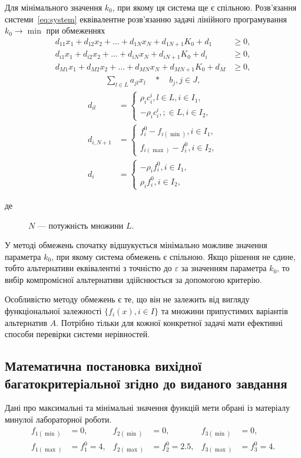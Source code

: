 Для мінімального значення $k_0$, при якому ця система ще є спільною. 
Розв'язання системи~\eqref{eq:system} еквівалентне розв'язанню задачі лінійного програмування $k_0 \to \min$ при обмеженнях 
\begin{align*}
	d_{11} x_1 	+ d_{12} x_2 + \ldots + d_{1N} x_N + d_{1 N+1} K_0 + d_1 &\geq 0, \\
	d_{i1} x_1 	+ d_{i2} x_2 + \ldots + d_{iN} x_N + d_{i N+1} K_0 + d_i &\geq 0, \\
	d_{M1} x_1 	+ d_{M2} x_2 + \ldots + d_{MN} x_N + d_{M N+1} K_0 + d_M &\geq 0,
\end{align*}
\begin{gather*}
	\sum_{l \in L}{a_{jl} x_l \quad * \quad b_j}, j \in J,
\end{gather*}
\begin{align*}
	d_{il} &= 
	\begin{cases}
		\rho_i c_{i}^i, l \in L, i \in I_1, \\
		-\rho_i c_{i}^i, ; \in L, i \in I_2, 
	\end{cases} \\
	d_{i, N+1} &= 
	\begin{cases}
		f_{i}^0 - f_{i(\min)}, i \in I_1, \\
		f_{i(\max)} - f_{i}^0 , i \in I_2,
	\end{cases} \\
	d_{i} &= 
	\begin{cases}
		- \rho_i f_{i}^0, i \in I_1, \\
		\rho_i f_{i}^0, i \in I_2, 
	\end{cases}
\end{align*}
\begin{description}
\item[де] $N$ --- потужність множини $L$.
\end{description}

У методі обмежень спочатку відшукується мінімально можливе значення параметра $k_0$, при якому система обмежень є спільною. 
Якщо рішення не єдине, тобто альтернативи еквівалентні з точністю до $\varepsilon$ за значенням параметра $k_0$, то вибір компромісної альтернативи здійснюється за допомогою критерію.

Особливістю методу обмежень є те, що він не залежить від вигляду функціональної залежності $\{ f_i(x), i \in I \}$ та множини припустимих варіантів альтернатив $A$.
Потрібно тільки для кожної конкретної задачі мати ефективні способи перевірки системи нерівностей.

\subsection{Математична постановка вихідної багатокритеріальної згідно до виданого завдання}
Дані про максимальні та мінімальні значення функцій мети обрані із матеріалу минулої лабораторної роботи.
\begin{align*}
    f_{1(\min)}&=0, &   f_{2(\min)}&=0, &   f_{3(\min)}&=0, \\
    f_{1(\max)}&=f_1^0=4,   &   f_{2(\max)}&=f_2^0=2.5, &   f_{3(\max)}&=f_3^0=4.
\end{align*} 

